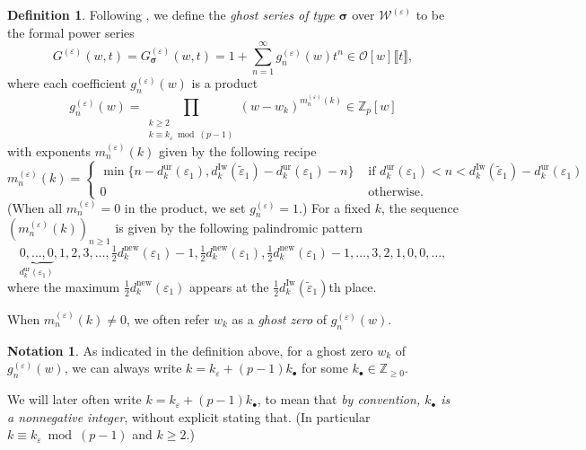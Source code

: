 \documentclass[12pt]{amsart}
\theoremstyle{definition}
\newtheorem{definition}[subsection]{Definition}
\newtheorem{notation}[subsection]{Notation}
\numberwithin{equation}{subsection}
\def\calO{\mathcal{O}}
\def\calW{\mathcal{W}}
\def\ZZ{\mathbb{Z}}
\newcommand{\bbsigma}{\boldsymbol{\sigma}}
\newcommand{\new}{\mathrm{new}}
\newcommand{\Iw}{\mathrm{Iw}}
\newcommand{\ur}{\mathrm{ur}}
\begin{document}
\begin{definition}
\label{D:ghost series}
Following \cite{bergdall-pollack}, we define the \emph{ghost series of type $\bbsigma$}  over $\calW^{(\varepsilon)}$ to be the formal power series
$$
G^{(\varepsilon)}(w,t)=G^{(\varepsilon)}_{\bbsigma}(w,t) = 1+\sum_{n=1}^\infty
g_n^{(\varepsilon)}(w)t^n\in \calO[w]\llbracket t\rrbracket,
$$
where each coefficient $g_n^{(\varepsilon)}(w)$ is a product
\begin{equation}
\label{E:gi varepsilon}
g_n^{(\varepsilon)}(w) = \prod_{\substack{k \geq 2\\ k \equiv k_\varepsilon \bmod{(p-1)}}} (w - w_k)^{m_n^{(\varepsilon)}(k)} \in \ZZ_p[w]
\end{equation}
with exponents $m_n^{(\varepsilon)}(k)$ given by the following recipe
\[
m_n^{(\varepsilon)}(k) = \begin{cases}
\min\big\{ n - d_{k}^\ur( \varepsilon_1) , d_{k}^\Iw(\tilde \varepsilon_1)- d_{k}^\ur(\varepsilon_1) - n\big\} & \textrm{ if }d_{k}^\ur(\varepsilon_1) < n < d_{k}^\Iw(\tilde\varepsilon_1) - d_{k}^\ur(\varepsilon_1)
\\
0 & \textrm{ otherwise.}
\end{cases}
\]
(When all $m_n^{(\varepsilon)}=0$ in the product, we set $g_n^{(\varepsilon)}=1$.)
For a fixed $k$, the sequence $(m_n^{(\varepsilon)}(k))_{n \geq 1}$ is given by the following palindromic pattern
\begin{equation}
\label{E:cascading pattern}
\underbrace{0, \dots, 0}_{d_{k}^{\ur}(\varepsilon_1)}, 1, 2, 3, \dots, \tfrac12 d_{k}^{\textrm{new}}(\varepsilon_1) -1, \tfrac12{d_{k}^{\textrm{new}}(\varepsilon_1)}, \tfrac12{d_{k}^{\textrm{new}}(\varepsilon_1)} -1,\dots,  3, 2, 1, 0, 0, \dots,
\end{equation}
where the maximum $\frac 12 d_{k}^{\new}(\varepsilon_1)$ appears at the $\frac 12 d_{k}^{\Iw}(\tilde\varepsilon_1)$th place.

When $m_n^{(\varepsilon)}(k) \neq 0$, we often refer $w_k$ as a \emph{ghost zero} of $g_n^{(\varepsilon)}(w)$.
\end{definition}

\begin{notation}
\label{N:kbullet}
As indicated in the definition above, for a ghost zero $w_k$ of $g_n^{(\varepsilon)}(w)$, we can always write $k = k_\varepsilon + (p-1)k_\bullet$ for some $k_\bullet \in \ZZ_{\geq 0}$.

We will later often write $k = k_\varepsilon + (p-1)k_\bullet$, to mean that \emph{by convention, $k_\bullet$ is a nonnegative integer}, without explicit stating that. (In particular $k\equiv k_\varepsilon \bmod (p-1)$ and $k\geq 2$.)
\end{notation}
\end{document}
